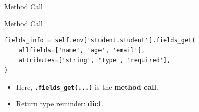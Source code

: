\begin{frame}[fragile]{Method Call}
\begin{block}{Method Call}
\begin{lstlisting}
fields_info = self.env['student.student'].fields_get(
	allfields=['name', 'age', 'email'],
	attributes=['string', 'type', 'required'],
)
\end{lstlisting}
	\begin{itemize}
		\item Here, \textbf{\texttt{.fields\_get(...)}} is the \textbf{method call}.
		\item Return type reminder: \textbf{dict}.
	\end{itemize}
\end{block}
\end{frame}
